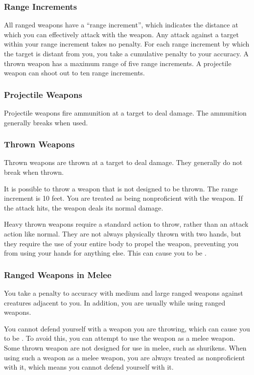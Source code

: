         \subsubsection{Range Increments}\label{Range Increment} All ranged weapons have a ``range increment'', which indicates the distance at which you can effectively attack with the weapon. Any attack against a target within your range increment takes no penalty. For each range increment by which the target is distant from you, you take a cumulative  penalty to your accuracy. A thrown weapon has a maximum range of five range increments. A projectile weapon can shoot out to ten range increments.

        \subsubsection{Projectile Weapons} Projectile weapons fire ammunition at a target to deal damage. The ammunition generally breaks when used.

        \subsubsection{Thrown Weapons}\label{Thrown Weapons} Thrown weapons are thrown at a target to deal damage. They generally do not break when thrown.

             It is possible to throw a weapon that is not designed to be thrown. The range increment is 10 feet. You are treated as being nonproficient with the weapon. If the attack hits, the weapon deals its normal damage.

             Heavy thrown weapons require a standard action to throw, rather than an attack action like normal. They are not always physically thrown with two hands, but they require the use of your entire body to propel the weapon, preventing you from using your hands for anything else. This can cause you to be .

        \subsubsection{Ranged Weapons in Melee}

            You take a  penalty to accuracy with medium and large ranged weapons against creatures adjacent to you. In addition, you are usually  while using ranged weapons.

            \label{Thrown Weapons in Melee} You cannot defend yourself with a weapon you are throwing, which can cause you to be . To avoid this, you can attempt to use the weapon as a melee weapon. Some thrown weapon are not designed for use in melee, such as shurikens. When using such a weapon as a melee weapon, you are always treated as nonproficient with it, which means you cannot defend yourself with it.

